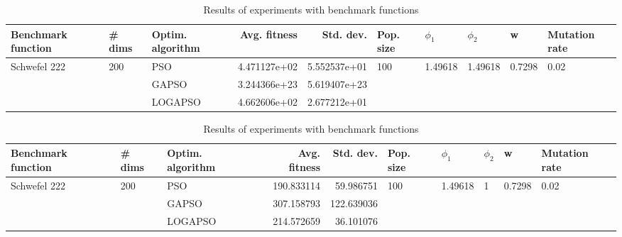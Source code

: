 \documentclass{article}
\begin{document}
\begin{table}
\centering
\caption{Results of experiments with benchmark functions}
\begin{tabular}{lllrrlllll}
\toprule
           Benchmark function &              \# dims & Optim. algorithm &  Avg. fitness &    Std. dev. &            Pop. size &               $\phi_{1}$ &               $\phi_{2}$ &                       w &         Mutation rate \\
\midrule
\multirow{3}{*}{Schwefel 222} & \multirow{3}{*}{200} &              PSO &  4.471127e+02 & 5.552537e+01 & \multirow{3}{*}{100} & \multirow{3}{*}{1.49618} & \multirow{3}{*}{1.49618} & \multirow{3}{*}{0.7298} & \multirow{3}{*}{0.02} \\
                              &                      &            GAPSO &  3.244366e+23 & 5.619407e+23 &                      &                          &                          &                         &                       \\
                              &                      &          LOGAPSO &  4.662606e+02 & 2.677212e+01 &                      &                          &                          &                         &                       \\
\bottomrule
\end{tabular}
\end{table}
\begin{table}
\centering
\caption{Results of experiments with benchmark functions}
\begin{tabular}{lllrrlllll}
\toprule
           Benchmark function &              \# dims & Optim. algorithm &  Avg. fitness &  Std. dev. &            Pop. size &               $\phi_{1}$ &         $\phi_{2}$ &                       w &         Mutation rate \\
\midrule
\multirow{3}{*}{Schwefel 222} & \multirow{3}{*}{200} &              PSO &    190.833114 &  59.986751 & \multirow{3}{*}{100} & \multirow{3}{*}{1.49618} & \multirow{3}{*}{1} & \multirow{3}{*}{0.7298} & \multirow{3}{*}{0.02} \\
                              &                      &            GAPSO &    307.158793 & 122.639036 &                      &                          &                    &                         &                       \\
                              &                      &          LOGAPSO &    214.572659 &  36.101076 &                      &                          &                    &                         &                       \\
\bottomrule
\end{tabular}
\end{table}
\end{document}
